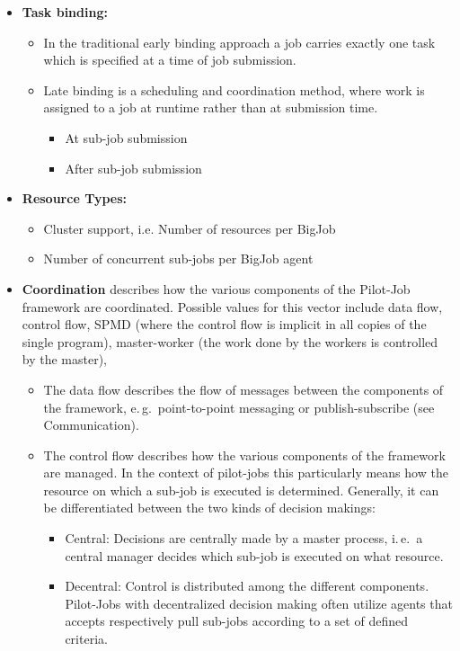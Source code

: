 \documentclass[]{article}
\begin{document}
\begin{itemize}
	\item \textbf{Task binding:~\cite{diane-thesis}} 
		\begin{itemize}
			\item In the traditional early binding approach a job carries
			 exactly one task which is specified at a time of job submission.
			\item Late binding is a scheduling and coordination
			 method, where work is assigned to a job at runtime rather than at
			 submission time.
			\begin{itemize}
				\item At sub-job submission 
				\item After sub-job submission
			\end{itemize}
		\end{itemize} 	

	\item \textbf{Resource Types:}
	\begin{itemize}
		\item Cluster support, i.e. Number of resources per BigJob
		\item Number of concurrent sub-jobs per BigJob agent
	\end{itemize}
	\item \textbf{Coordination} describes how the various components of 
	the Pilot-Job framework are	coordinated. Possible values for this vector include data
	flow, control flow, SPMD (where the control flow is implicit in all copies of the single program), master-worker
	(the work done by the workers is controlled by the master),
	\begin{itemize}
		\item The data flow describes the flow of messages between the components of the framework, e.\,g.\ point-to-point messaging or publish-subscribe (see Communication).
		\item The control flow describes how the various components of the
		 framework are managed. In the context of pilot-jobs this particularly means how the resource on which a sub-job is executed is determined. Generally, it can be differentiated between the two kinds of decision makings:
			\begin{itemize}
				\item Central: Decisions are centrally made by a master
				 process, i.\,e.\ a central manager decides which sub-job is
				 executed on what resource.
				\item Decentral: Control is distributed among the 
				different components. Pilot-Jobs with decentralized decision 
				making often utilize agents that accepts respectively pull 
				sub-jobs according to a set of defined criteria.
			\end{itemize}
			

\end{itemize}
\end{itemize}
\end{document}

